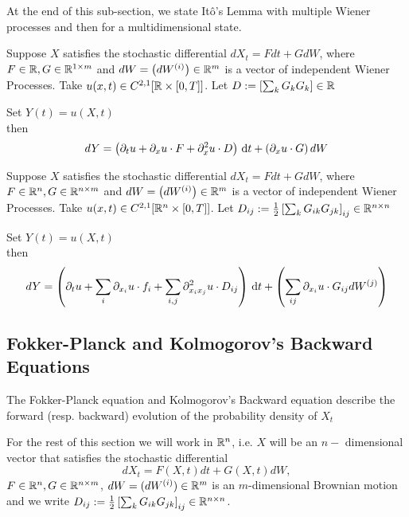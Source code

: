 At the end of this sub-section, we state It\^o's Lemma with multiple Wiener
processes and then for a multidimensional state.

\begin{thm} Suppose $X$ satisfies the stochastic
differential $dX_t = F dt + G dW$, where $ F \in { \mathbb{R} }, G \in { \mathbb{R} }^{1\times m}$ and
$dW = \left(dW^{(i)}\right) \in  { \mathbb{R} }^{m}$ is a vector of independent Wiener
Processes. Take $u(x,t) \in C^{2,1}[ { \mathbb{R} } \times [0,T]]$. Let $D :=\left[{\sum_k
G_{k} G_{k} } \right] \in { \mathbb{R} }$

Set $Y(t) = u(X,t)$
\\
then
$$
dY =  \left( {\partial}_t u +  {\partial}_{x} u \cdot F + 
  {\partial}^2_{x} u \cdot D \right)
\, \mathrm{d} t +
 \left(  {\partial}_{x} u  \cdot  G \right) dW  
$$
\end{thm}

\begin{thm}
Suppose $X$ satisfies the stochastic differential $dX_t = F dt + G dW$, where $
F \in { \mathbb{R} }^n, G \in { \mathbb{R} }^{n\times m}$ and $dW = \left(dW^{(i)}\right) \in  { \mathbb{R} }^{ 
m}$ is a vector of independent Wiener Processes. Take $u(x,t) \in C^{2,1}[ { \mathbb{R} }^n
\times [0,T]]$. Let $D_{ij} := \tfrac{1}{2} \left[{\sum_k G_{ik} G_{jk} }
\right]_{ij} \in { \mathbb{R} }^{n\times n} $

Set $Y(t) = u(X,t)$
\\
then
$$
dY =  \left( {\partial}_t u + \sum_i {\partial}_{x_i} u \cdot f_i + 
\sum_{i,j} {\partial}^2_{x_i x_j} u \cdot D_{ij} \right)
\, \mathrm{d} t +
 \left(  \sum_{ij} {\partial}_{x_i} u  \cdot G_{ij} dW^{(j)} 
\right)$$
\end{thm} 

\subsection{Fokker-Planck and Kolmogorov's Backward Equations}
The Fokker-Planck equation and Kolmogorov's Backward equation describe the
forward (resp. backward)  evolution of the probability density of $X_t$

For the rest of this section we will work in $ { \mathbb{R} }^n$, i.e. $X$ will be an $n-$
dimensional vector that satisfies the stochastic differential
\begin{equation}
dX_t = F(X,t) dt + G(X,t) dW,
\label{eq:generic_Ito_SDE_Rn}
\end{equation}
$F \in { \mathbb{R} }^n, G \in { \mathbb{R} }^{n \times m}$,
$dW = (dW^{(i)}) \in  { \mathbb{R} }^{  m}$ is an $m$-dimensional Brownian motion and we
write $D_{ij} :=
\tfrac{1}{2} 
\left[{\sum_k G_{ik} G_{jk} } \right]_{ij} \in { \mathbb{R} }^{n\times n} $.

